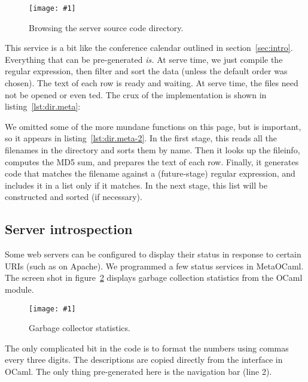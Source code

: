 \documentclass[preprint]{acm_proc_article-sp}
\def\MOC{MetaOCaml}
\newcommand{\myfig}[3]{%
  \begin{figure}[tbp]%
    #3%
    \caption{#2}%
    \label{fig:#1}%
  \end{figure}}
\newcommand{\screenshot}[2]{%
  \myfig{#1}{#2}
  {\centering%
    \texttt{[image: \#1]}}}
\newcommand{\mylst}[3]{%
  }
\begin{document}
\screenshot{server-dir}{Browsing the server source code directory.}

This service is a bit like the conference calendar outlined in
section~\ref{sec:intro}.  Everything that can be pre-generated
\emph{is.}  At serve time, we just compile the regular expression,
then filter and sort the data (unless the default order was chosen).
The text of each row is ready and waiting.  At serve time, the files
need not be opened or even ted.  The crux of the
implementation is shown in listing~\ref{lst:dir.meta}:

\mylst{lastline=39,}{dir.meta}{Implementation of directory
  browsing service.  This is the page part; some top-level
  declarations were omitted.  See also
  listing~\ref{lst:dir.meta-2}.}

We omitted some of the more mundane functions on this page, but
 is important, so it appears in
listing~\ref{lst:dir.meta-2}.  In the first stage, this reads
all the filenames in the directory and sorts them by name.  Then
it looks up the fileinfo, computes the MD5 sum, and prepares the
text of each row.  Finally, it generates code that matches the
filename against a (future-stage) regular expression, and
includes it in a list only if it matches.  In the next stage,
this list will be constructed and sorted (if necessary).  

\mylst{}{dir.meta-2}{This top-level function transforms a list
  of filenames into a code sequence that tests each name against
  a regexp, and adds it to the list only in the case of a
  match.}

\subsection{Server introspection}

Some web servers can be configured to display their status in
response to certain URIs (such as  on
Apache).  We programmed a few status services in \MOC.  The
screen shot in figure~\ref{fig:gc} displays garbage collection
statistics from the OCaml  module.

\screenshot{gc}{Garbage collector statistics.}

The only complicated bit in the code is to format the numbers
using commas every three digits.  The descriptions are copied
directly from the  interface in OCaml.  The only
thing pre-generated here is the navigation bar (line 2).

\mylst{lastline=30,}{gc.meta}{...}
\end{document}
